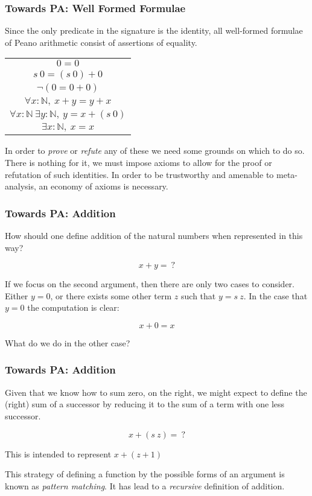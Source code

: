 \documentclass{beamer}
\theoremstyle{indentDefn} \newtheorem{defn}[]{Definition}
\begin{document}
\begin{frame}
	\frametitle{Towards PA: Well Formed Formulae}

	Since the only predicate in the signature is the identity, all well-formed formulae of Peano arithmetic consist of assertions of equality. 

	\begin{center}
		\begin{tabular}{c}
			$0 = 0$ \\
			$s \ 0 = (s \ 0) + 0$ \\
			$\lnot (0 = 0 + 0)$ \\
			$\forall x : \mathbb{N}, \ x + y = y + x$ \\
			$\forall x : \mathbb{N} \ \exists y : \mathbb{N}, \ y = x + (s \ 0)$ \\
			$\exists x : \mathbb{N}, \ x = x$
		\end{tabular}
	\end{center}

	In order to \emph{prove} or \emph{refute} any of these we need some grounds on which to do so. There is nothing for it, we must impose axioms to allow for the proof or refutation of such identities. In order to be trustworthy and amenable to meta-analysis, an economy of axioms is necessary. 

\end{frame}

\begin{frame}
	\frametitle{Towards PA: Addition}
	How should one define addition of the natural numbers when represented in this way? 

	$$ x + y =  \ ?$$

	If we focus on the second argument, then there are only two cases to consider. Either $y = 0$, or there exists some other term $z$ such that $y = s \ z$. In the case that $y = 0$ the computation is clear: 

	$$x + 0 = x$$

	What do we do in the other case? 


\end{frame}

\begin{frame}
	\frametitle{Towards PA: Addition}

	Given that we know how to sum zero, on the right, we might expect to define the (right) sum of a successor by reducing it to the sum of a term with one less successor. 

	$$ x + (s \ z) =  \ ?$$

	This is intended to represent $x + (z + 1)$

	\vspace{2.5cm}

	This strategy of defining a function by the possible forms of an argument is known as \emph{pattern matching}. It has lead to a \emph{recursive} definition of addition.
\end{frame}
\end{document}
